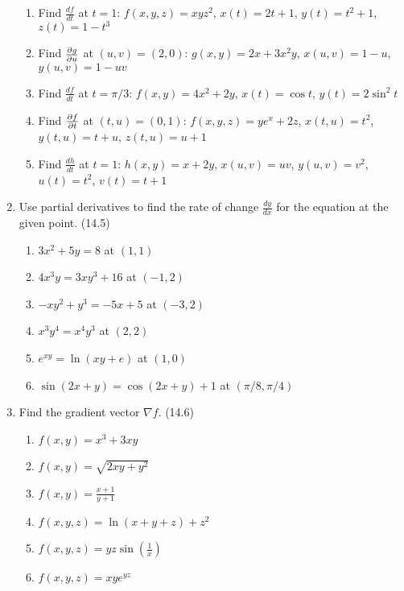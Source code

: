 \begin{enumerate}
      \begin{enumerate}
        \item Find $\frac{df}{dt}$ at $t=1$: \newline
          $f(x,y,z)=xyz^2$, $x(t)=2t+1$, $y(t)=t^2+1$, $z(t)=1-t^3$
        \item Find $\frac{\partial g}{\partial u}$ at $(u,v)=(2,0)$: \newline
          $g(x,y)=2x+3x^2y$, $x(u,v)=1-u$, $y(u,v)=1-uv$
        \item Find $\frac{df}{dt}$ at $t=\pi/3$: \newline
          $f(x,y)=4x^2+2y$, $x(t)=\cos t$, $y(t)=2\sin^2 t$
        \item Find $\frac{\partial f}{\partial t}$ at $(t,u)=(0,1)$: \newline
          $f(x,y,z)=ye^x+2z$, $x(t,u)=t^2$, $y(t,u)=t+u$, $z(t,u)=u+1$
        \item Find $\frac{dh}{dt}$ at $t=1$: \newline
          $h(x,y)=x+2y$, $x(u,v)=uv$, $y(u,v)=v^2$, $u(t)=t^2$, $v(t)=t+1$
      \end{enumerate}

    \item Use partial derivatives to find the rate of change $\frac{dy}{dx}$ for the equation at the given point. (14.5)

      \begin{enumerate}
        \item $3x^2+5y=8$ at $(1,1)$
        \item $4x^3y=3xy^3+16$ at $(-1,2)$
        \item $-xy^2+y^3=-5x+5$ at $(-3,2)$
        \item $x^3y^4=x^4y^3$ at $(2,2)$
        \item $e^{xy}=\ln(xy+e)$ at $(1,0)$
        \item $\sin(2x+y)=\cos(2x+y)+1$ at $(\pi/8,\pi/4)$
      \end{enumerate}

    \item Find the gradient vector $\nabla f$. (14.6)

      \begin{enumerate}
        \item $f(x,y)=x^3+3xy$
        \item $f(x,y)=\sqrt{2xy+y^2}$
        \item $f(x,y)=\frac{x+1}{y+1}$
        \item $f(x,y,z)=\ln(x+y+z)+z^2$
        \item $f(x,y,z)=yz\sin(\frac{1}{x})$
        \item $f(x,y,z)=xye^{yz}$
      \end{enumerate}


\end{enumerate}
